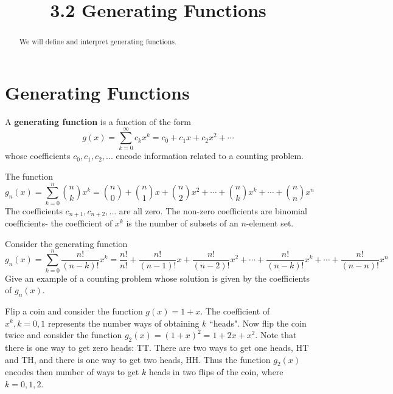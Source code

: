 \documentclass[handout]{ximera}
\title{3.2 Generating Functions}
\begin{document}
\begin{abstract}
We will define and interpret generating functions.
\end{abstract}

\maketitle

\section{Generating Functions}

\begin{definition}
A \textbf{generating function} is a function of the form
\[
g(x) = \sum_{k=0}^\infty c_kx^k = c_0 + c_1 x + c_2 x^2 + \cdots
\]
whose coefficients $c_0, c_1, c_2, ...$ encode information related to a counting problem.
\end{definition}


\begin{example}[example 1]
The function
\[
g_n(x) = \sum_{k=0}^n \binom{n}{k}x^k  = \binom{n}{0}+ \binom{n}{1}x + \binom{n}{2}x^2 + \cdots + 
\binom{n}{k}x^k + \cdots + \binom{n}{n} x^n
\]
The coefficients $c_{n+1}, c_{n+2}, ...$ are all zero.
The non-zero coefficients are binomial coefficients- the coefficient of $x^k$ is the number of subsets of an $n$-element set.
\end{example}

\begin{problem}
Consider the generating function
\[
g_n(x) = \sum_{k=0}^n \frac{n!}{(n-k)!}x^k  = \frac{n!}{n!}+ \frac{n!}{(n-1)!}x + \frac{n!}{(n-2)!}x^2 + \cdots + 
\frac{n!}{(n-k)!}x^k + \cdots + \frac{n!}{(n-n)!} x^n
\]
Give an example of a counting problem whose solution is given by the coefficients of $g_n(x)$.
\end{problem}

\begin{example}[example 2]
Flip a coin and consider the function $g(x) = 1+x$.  The coefficient of $x^k, k = 0,1$ represents the number ways of 
obtaining $k$ ``heads". Now flip the coin twice and consider the function $g_2(x) = (1+x)^2 = 1 + 2x + x^2$.
Note that there is one way to get zero heads: TT. There are two ways to get one heads, HT and TH, 
and there is one way to get two heads, HH. Thus the function $g_2(x)$ encodes then number of ways to 
get $k$ heads in two flips of the coin, 
where $k = 0, 1, 2$.
\end{example}
\end{document}

